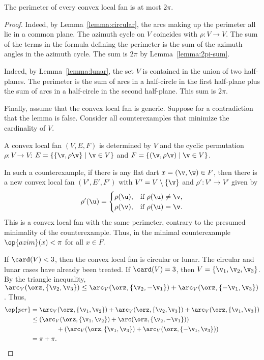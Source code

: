 \begin{lemma} %
\label{lemma:convex-hyp}
The perimeter of every convex local fan is at most $2\pi$.  
\end{lemma}
%
%

\begin{proof} 
  Indeed, by Lemma~\ref{lemma:circular},
the arcs making up the perimeter all lie in a common plane.  The
azimuth cycle on $V$ coincides with $\rho:V\to V$.  The sum of the
terms in the formula defining the perimeter is the sum of the
azimuth angles in the azimuth cycle.  The sum is $2\pi$ by
Lemma~\ref{lemma:2pi-sum}.


  Indeed, by Lemma~\ref{lemma:lunar}, the
set $V$ is contained in the union of two half-planes.  The perimeter
is the sum of arcs in a half-circle in the first half-plane plus the
sum of arcs in a half-circle in the second half-plane. This sum is
$2\pi$.

Finally, assume that the convex local fan is generic.  Suppose for a
contradiction that the lemma is false.  Consider all counterexamples
that minimize the cardinality of $V$.  

A convex local fan $(V,E,F)$ is determined by $V$ and the cyclic
permutation $\rho:V\to V$: $E=\{\{\v,\rho \v\}\mid \v\in V\}$ and $F
= \{(\v,\rho \v)\mid \v\in V\}$.

In such a counterexample, if there is any flat dart $x=(\v,\w)\in F$,
then there is a new convex local fan $(V',E',F')$ with $V' =
V\setminus\{\v\}$ and $\rho':V'\to V'$ given by
\[ 
\rho'(\u) = \begin{cases}
\rho(\u), & \text{if } \rho(\u)\ne \v,\\
\rho(\v), & \text{if }\rho(\u) = \v.\\
\end{cases}
\] 
This is a convex local fan with the same perimeter, contrary to the presumed
minimality of the counterexample.  Thus, in the minimal counterexample
$\op{azim}(x) <\pi$ for all $x\in F$.

If $\card(V) <3$, then the convex local fan is circular or lunar.  The
circular and lunar cases have 
already been treated.  If $\card(V)=3$, then $V=\{\v_1,\v_2,\v_3\}$.
By the triangle inequality, $\arc_V(\orz,\{\v_2,\v_3\}) \le
\arc_V(\orz,\{\v_2,-\v_1\})+\arc_V(\orz,\{-\v_1,\v_3\})$.  Thus,
\begin{align*}
  \op{per} &=\arc_V(\orz,\{\v_1,\v_2\}) 
  + \arc_V(\orz,\{\v_2,\v_3\}) 
  + \arc_V(\orz,\{\v_1,\v_3\})\\
  &\le(\arc_V(\orz,\{\v_1,\v_2\})+\arc(\orz,\{\v_2,-\v_1\}))
  \\&\qquad\qquad+(\arc_V(\orz,\{\v_1,\v_3\})
+\arc_V(\orz,\{-\v_1,\v_3\})) \\
  &= \pi+\pi.
\end{align*}


\end{proof}
